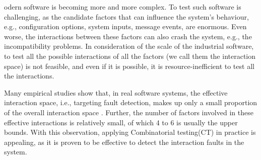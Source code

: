 \documentclass[10pt,journal,compsoc]{IEEEtran}
\begin{document}
%
%
%
%
odern software is becoming more and more complex. To test such software is challenging, as the candidate factors that can influence the system's behaviour, e.g., configuration options, system inputs, message events, are enormous. Even worse, the interactions between these factors can also crash the system, e.g., the incompatibility problems. In consideration of the scale of the industrial software, to test all the possible interactions of all the factors (we call them the interaction space) is not feasible, and even if it is possible, it is resource-inefficient to test all the interactions.

Many empirical studies show that, in real software systems, the effective interaction space, i.e., targeting fault detection, makes up only a small proportion of the overall interaction space \cite{kuhn2002investigation,kuhn2004software}. Further, the number of factors involved in these effective interactions is relatively small, of which 4 to 6 is usually the upper bounds\cite{kuhn2002investigation}. With this observation, applying Combinatorial testing(CT) in practice is appealing, as it is proven to be effective to detect the interaction faults in the system.
\end{document}
